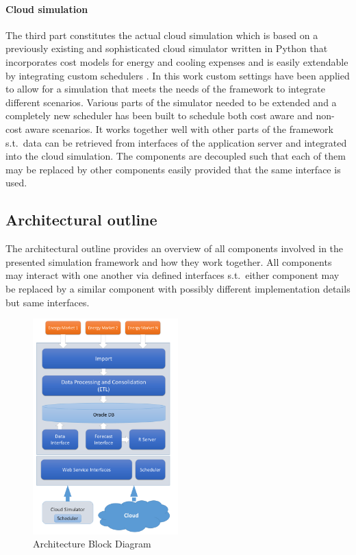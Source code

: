 \paragraph{Cloud simulation}
The third part constitutes the actual cloud simulation which is based on a previously existing and sophisticated cloud simulator written in Python that incorporates cost models for energy and cooling expenses and is easily extendable by integrating custom schedulers \cite{lucanin2015philharmonic}. In this work custom settings have been applied to allow for a simulation that meets the needs of the framework to integrate different scenarios. Various parts of the simulator needed to be extended and a completely new scheduler has been built to schedule both cost aware and non-cost aware scenarios. It works together well with other parts of the framework s.t.~data can be retrieved from interfaces of the application server and integrated into the cloud simulation. The components are decoupled such that each of them may be replaced by other components easily provided that the same interface is used. 


\subsection{Architectural outline}

The architectural outline provides an overview of all components involved in the presented simulation framework and how they work together. All components may interact with one another via defined interfaces s.t.~either component may be replaced by a similar component with possibly different implementation details but same interfaces. 

\begin{figure}[htbp]
	\centering
	\vspace{-0.4in}
		\includegraphics[width=0.5\textwidth]{figures/simulation_framework/Block_Diagram_Architecture.png}
	\caption{Architecture Block Diagram}
	\label{fig:Block_Diagram_Architecture}
\end{figure}


